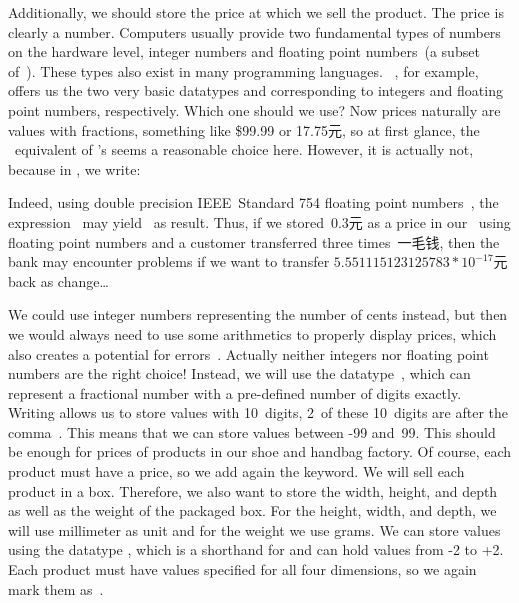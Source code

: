 Additionally, we should store the price at which we sell the product.
The price is clearly a number.
Computers usually provide two fundamental types of numbers on the hardware level, integer numbers and floating point numbers~(a subset of~\realNumbers).
These types also exist in many programming languages.
\python~\cite{programmingWithPython}, for example, offers us the two very basic datatypes  and  corresponding to integers and floating point numbers, respectively.
Which one should we use?
Now prices naturally are values with fractions, something like \$99.99 or 17.75元, so at first glance, the \sql\ equivalent of \python's  seems a reasonable choice here.
However, it is actually not, because in \cite{programmingWithPython}, we write:%
%
%
%
\begin{sloppypar}%
Indeed, using double precision IEEE~Standard 754 floating point numbers~\cite{IEEE2019ISFFPA,H1997IS7FPN}, the expression~ may yield~ as result.
Thus, if we stored~0.3元 as a price in our \db\ using floating point numbers and a customer transferred three times~一毛钱, then the bank may encounter problems if we want to transfer $5.551115123125783*10^{-17}$元 back as change\dots
\end{sloppypar}%
%
%
%
We could use integer numbers representing the number of cents instead, but then we would always need to use some arithmetics to properly display prices, which also creates a potential for errors~\cite{W2020HSISCVISS}.
Actually neither integers nor floating point numbers are the right choice!
Instead, we will use the datatype~, which can represent a fractional number with a pre-defined number of digits exactly.
Writing  allows us to store values with 10~digits, 2~of these 10~digits are after the comma~\cite{PGDG:PD:NT}.
This means that we can store values between -99 and~99.
This should be enough for prices of products in our shoe and handbag factory.
Of course, each product must have a price, so we add again the  keyword.%
%
%
%
We will sell each product in a box.
Therefore, we also want to store the width, height, and depth as well as the weight of the packaged box.
For the height, width, and depth, we will use millimeter as unit and for the weight we use grams.
We can store values using the datatype , which is a shorthand for  and can hold values from -2 to +2.
Each product must have values specified for all four dimensions, so we again mark them as~.


